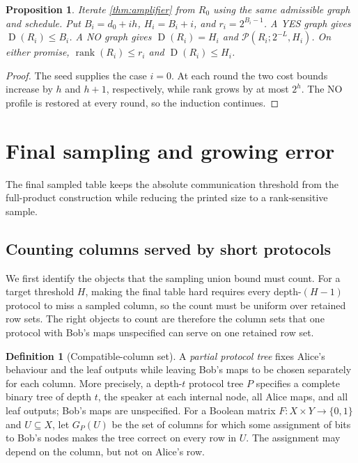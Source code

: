 \documentclass[11pt]{article} \usepackage[utf8]{inputenc}
\theoremstyle{plain} \newtheorem{theorem}{Theorem}[section]
\newtheorem{proposition}[proposition]{Proposition}
\theoremstyle{definition} \newaliascnt{definition}{theorem}
\newtheorem{definition}[definition]{Definition} \aliascntresetthe{definition}
\newcommand{\D}{\operatorname{D}}
\newcommand{\RP}[3]{\mathcal{P}(#1;#2,#3)}
\DeclareMathOperator{\rank}{rank} \crefname{claim}{Claim}{Claims}
\begin{document}
\begin{proposition}\label{prop:iteration}
Iterate \cref{thm:amplifier} from $R_0$ using the same admissible graph and
schedule. Put $B_i=d_0+ih$, $H_i=B_i+i$, and $r_i=2^{B_i-1}$. A YES graph
gives $\D(R_i)\le B_i$. A NO graph gives
$\D(R_i)=H_i$ and $\RP{R_i}{2^{-L}}{H_i}$. On either promise,
$\rank(R_i)\le r_i$ and $\D(R_i)\le H_i$.
\end{proposition}
\begin{proof}
The seed supplies the case $i=0$. At each round the two cost bounds increase
by $h$ and $h+1$, respectively, while rank grows by at most $2^h$.
The NO profile is restored at every round, so the induction continues.
\end{proof}

\section{Final sampling and growing error}
\label{sec:quantitative}

The final sampled table keeps the absolute communication threshold from the
full-product construction while reducing the printed size to a rank-sensitive
sample.

\subsection{Counting columns served by short protocols}

We first identify the objects that the sampling union bound must count. For a
target threshold $H$, making the final table hard requires every depth-$(H-1)$
protocol to miss a sampled column, so the count must be uniform over retained
row sets. The right objects to count are therefore the column sets that one
protocol with Bob's maps unspecified can serve on one retained row set.

\begin{definition}[Compatible-column set]\label{def:compatibility}
A \emph{partial protocol tree} fixes Alice's behaviour and the leaf outputs
while leaving Bob's maps to be chosen separately for each column. More
precisely, a depth-$t$ protocol tree $P$ specifies a complete binary tree of
depth $t$, the speaker at each internal node, all Alice maps, and all leaf
outputs; Bob's maps are unspecified. For a Boolean matrix
$F:X\times Y\to\{0,1\}$ and $U\subseteq X$, let $G_P(U)$ be the set of columns
for which some assignment of bits to Bob's nodes makes the tree correct on every
row in $U$. The assignment may depend on the column, but not on Alice's row.
\end{definition}
\end{document}
